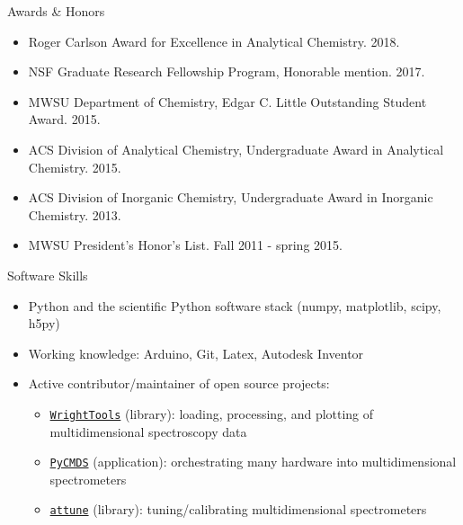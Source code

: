 \documentclass{resume} %
\begin{document}
\begin{rSection}{Awards \& Honors}

\begin{itemize}[leftmargin = 0 pt]
	\item Roger Carlson Award for Excellence in Analytical Chemistry. 2018.
	\item NSF Graduate Research Fellowship Program, Honorable mention. 2017.
	\item MWSU Department of Chemistry, Edgar C. Little Outstanding Student Award. 2015.
	\item ACS Division of Analytical Chemistry, Undergraduate Award in Analytical Chemistry. 2015. 
	\item ACS Division of Inorganic Chemistry, Undergraduate Award in Inorganic Chemistry. 2013.
	\item MWSU President’s Honor’s List. Fall 2011 - spring 2015.
\end{itemize}

\end{rSection}

\begin{rSection}{Software Skills}
	\begin{itemize}[leftmargin = 0 pt]
		\item Python and the scientific Python software stack (numpy, matplotlib, scipy, h5py)
		\item Working knowledge: Arduino, Git, Latex, Autodesk Inventor
		\item Active contributor/maintainer of open source projects:
		\begin{itemize}
			\item \href{http://wright.tools}{\texttt{WrightTools}} (library): loading, processing, and plotting of multidimensional spectroscopy data 
			\item \href{http://github.com/wright-group/PyCMDS}{\texttt{PyCMDS}} (application): orchestrating many hardware into multidimensional spectrometers  
			\item \href{http://github.com/wright-group/attune}{\texttt{attune}} (library): tuning/calibrating multidimensional spectrometers
		\end{itemize}

	\end{itemize}	
\end{rSection}

\end{document}
